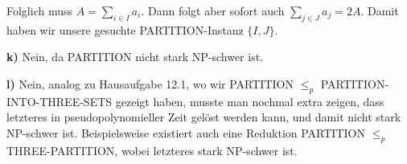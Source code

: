 \documentclass[a4paper,graphics,11pt]{article}
\begin{document}
Folglich muss $A = \sum_{i \in I} a_i$. Dann folgt aber sofort auch $\sum_{j \in J} a_j = 2A$.
Damit haben wir unsere gesuchte PARTITION-Instanz $\{I,J\}$.

\textbf{k)}
Nein, da PARTITION nicht stark \textsf{NP}-schwer ist.

\textbf{l)}
Nein, analog zu Hausaufgabe 12.1, wo wir PARTITION $\leq_p$ PARTITION-INTO-THREE-SETS gezeigt haben,
musste man nochmal extra zeigen, dass letzteres in pseudopolynomieller Zeit gelöst werden kann, und damit
nicht stark \textsf{NP}-schwer ist. Beispielsweise existiert auch eine Reduktion PARTITION $\leq_p$ THREE-PARTITION,
wobei letzteres stark \textsf{NP}-schwer ist.
\end{document}
